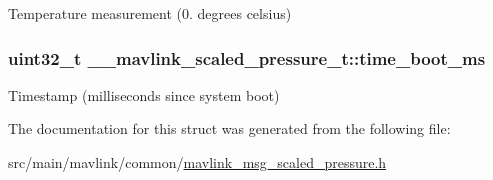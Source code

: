 Temperature measurement (0. degrees celsius) 

\hypertarget{struct____mavlink__scaled__pressure__t_a86306943b70fe3c60db24d56c90daf70}{
\subsubsection[{time\+\_\+boot\+\_\+ms}]{\setlength{\rightskip}{0pt plus 5cm}uint32\+\_\+t \+\_\+\+\_\+mavlink\+\_\+scaled\+\_\+pressure\+\_\+t\+::time\+\_\+boot\+\_\+ms}}\label{struct____mavlink__scaled__pressure__t_a86306943b70fe3c60db24d56c90daf70}


Timestamp (milliseconds since system boot) 



The documentation for this struct was generated from the following file\+:\begin{DoxyCompactItemize}
\item 
src/main/mavlink/common/\hyperlink{mavlink__msg__scaled__pressure_8h}{mavlink\+\_\+msg\+\_\+scaled\+\_\+pressure.\+h}\end{DoxyCompactItemize}
